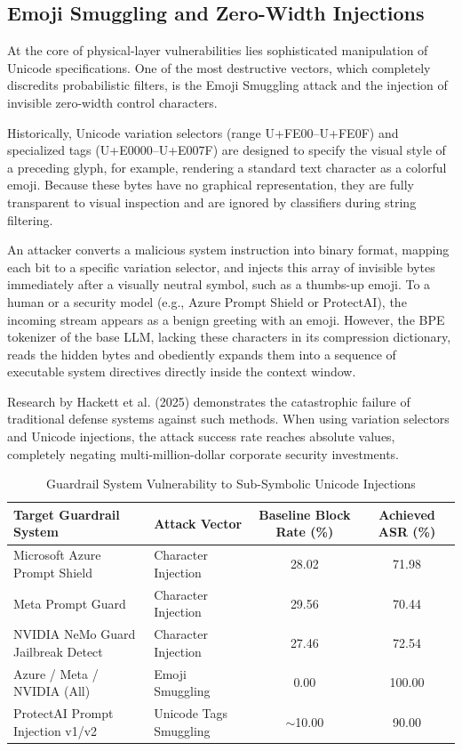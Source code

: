 \documentclass[10pt,a4paper]{article}
\begin{document}
\subsection{Emoji Smuggling and Zero-Width Injections}
At the core of physical-layer vulnerabilities lies sophisticated manipulation of Unicode specifications. One of the most destructive vectors, which completely discredits probabilistic filters, is the Emoji Smuggling attack and the injection of invisible zero-width control characters.

Historically, Unicode variation selectors (range U+FE00--U+FE0F) and specialized tags (U+E0000--U+E007F) are designed to specify the visual style of a preceding glyph, for example, rendering a standard text character as a colorful emoji. Because these bytes have no graphical representation, they are fully transparent to visual inspection and are ignored by classifiers during string filtering.

An attacker converts a malicious system instruction into binary format, mapping each bit to a specific variation selector, and injects this array of invisible bytes immediately after a visually neutral symbol, such as a thumbs-up emoji. To a human or a security model (e.g., Azure Prompt Shield or ProtectAI), the incoming stream appears as a benign greeting with an emoji. However, the BPE tokenizer of the base LLM, lacking these characters in its compression dictionary, reads the hidden bytes and obediently expands them into a sequence of executable system directives directly inside the context window.

Research by Hackett et al. (2025) demonstrates the catastrophic failure of traditional defense systems against such methods. When using variation selectors and Unicode injections, the attack success rate reaches absolute values, completely negating multi-million-dollar corporate security investments.

\begin{table}[h!]
\centering
\caption{Guardrail System Vulnerability to Sub-Symbolic Unicode Injections}
\vspace{2mm}
\begin{tabularx}{\textwidth}{X X c c}
\toprule
\textbf{Target Guardrail System} & \textbf{Attack Vector} & \textbf{Baseline Block Rate (\%)} & \textbf{Achieved ASR (\%)} \\
\midrule
Microsoft Azure Prompt Shield & Character Injection & 28.02 & 71.98 \\
Meta Prompt Guard & Character Injection & 29.56 & 70.44 \\
NVIDIA NeMo Guard Jailbreak Detect & Character Injection & 27.46 & 72.54 \\
Azure / Meta / NVIDIA (All) & Emoji Smuggling & 0.00 & 100.00 \\
ProtectAI Prompt Injection v1/v2 & Unicode Tags Smuggling & $\sim$10.00 & 90.00 \\
\bottomrule
\end{tabularx}
\end{table}
\end{document}
